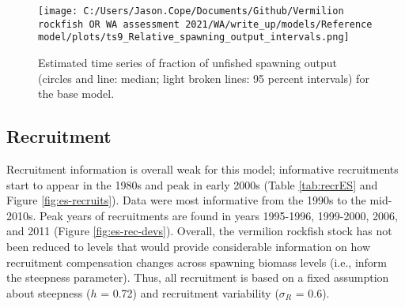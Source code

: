 \documentclass[11pt,
  english,
  a4paper,
]{article}
\begin{document}

\begin{figure}
\centering
\texttt{[image: C:/Users/Jason.Cope/Documents/Github/Vermilion rockfish OR WA assessment 2021/WA/write\_up/models/Reference model/plots/ts9\_Relative\_spawning\_output\_intervals.png]}
\caption{Estimated time series of fraction of unfished spawning output (circles and line: median; light broken lines: 95 percent intervals) for the base model.\label{fig:es-depl}}
\end{figure}

\tagmcend\tagstructend

\clearpage


\hypertarget{recruitment}{%
\subsection*{Recruitment}\label{recruitment}}

\leavevmode\tagmcend\tagstructend


Recruitment information is overall weak for this model; informative recruitments start to appear in the 1980s and peak in early 2000s (Table \ref{tab:recrES} and Figure \ref{fig:es-recruits}). Data were most informative from the 1990s to the mid-2010s. Peak years of recruitments are found in years 1995-1996, 1999-2000, 2006, and 2011 (Figure \ref{fig:es-rec-devs}). Overall, the vermilion rockfish stock has not been reduced to levels that would provide considerable information on how recruitment compensation changes across spawning biomass levels (i.e., inform the steepness parameter). Thus, all recruitment is based on a fixed assumption about steepness ({\(h\)\leavevmode\tagmcend\tagstructend} = 0.72) and recruitment variability ({\(\sigma_R\)\leavevmode\tagmcend\tagstructend} = 0.6).

\leavevmode\tagmcend\tagstructend\par


\end{document}
